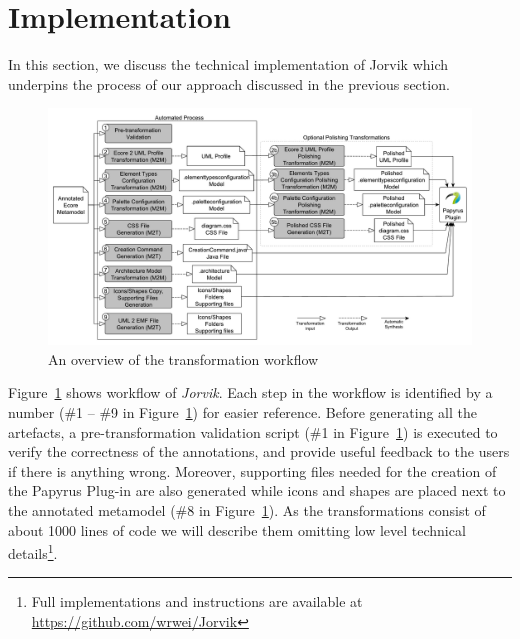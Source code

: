 \section{Implementation}
\label{sec:implementation}
In this section, we discuss the technical implementation of Jorvik which underpins the process of our approach discussed in the previous section. 


\begin{figure}[ht!]
	\centering
	\includegraphics[width=1\textwidth]{diagrams/transformationWorkflow.pdf}
	\caption[]{An overview of the transformation workflow}
	\label{fig:transformationWorkflow}
\end{figure}

Figure~\ref{fig:transformationWorkflow} shows workflow of \textit{Jorvik}. 
Each step in the workflow is identified by a number (\#1 -- \#9 in Figure~\ref{fig:transformationWorkflow}) for easier reference. 
Before generating all the artefacts, a pre-transformation validation script (\#1 in Figure~\ref{fig:transformationWorkflow}) is executed to verify the correctness of the annotations, and provide useful feedback to the users if there is anything wrong. 
Moreover, supporting files needed for the creation of the Papyrus Plug-in are also generated while icons and shapes are placed next to the annotated metamodel (\#8 in Figure~\ref{fig:transformationWorkflow}). 
As the transformations consist of about 1000 lines of code we will describe them omitting low level technical details\footnote{Full implementations and instructions are available at \url{https://github.com/wrwei/Jorvik}}. 


